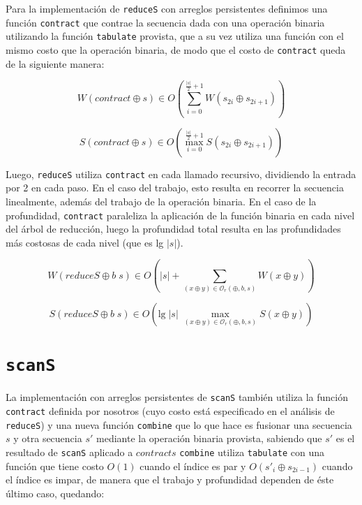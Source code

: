 \documentclass[a4paper,10pt]{article}
\begin{document}
Para la implementación de \texttt{reduceS} con arreglos persistentes definimos
una función \texttt{contract} que contrae la secuencia dada con una operación
binaria utilizando la función \texttt{tabulate} provista, que a su vez utiliza
una función con el mismo costo que la operación binaria, de modo que el costo
de \texttt{contract} queda de la siguiente manera:

\begin{equation*}
    W \left( contract \oplus s \right) \in
    O \left( \sum_{i=0}^{\frac{\vert s \vert}{2} + 1} W \left( s_{2i} \oplus s_{2i+1} \right) \right)
\end{equation*}

\begin{equation*}
    S \left( contract \oplus s \right) \in
    O \left( \max_{i=0}^{\frac{\vert s \vert}{2} + 1} S \left( s_{2i} \oplus s_{2i+1} \right) \right)
\end{equation*}

Luego, \texttt{reduceS} utiliza \texttt{contract} en cada llamado recursivo,
dividiendo la entrada por 2 en cada paso. En el caso del trabajo, esto resulta
en recorrer la secuencia linealmente, además del trabajo de la operación binaria.
En el caso de la profundidad, \texttt{contract} paraleliza la aplicación de la
función binaria en cada nivel del árbol de reducción, luego la profundidad total
resulta en las profundidades más costosas de cada nivel (que es lg $\vert s \vert$).

\begin{equation*}
    W \left( reduceS \oplus b \; s \right) \in
    O \left( \vert s \vert + \sum_{(x \oplus y) \in \mathcal{O}_r(\oplus,b,s)} W \left( x \oplus y \right) \right)
\end{equation*}

\begin{equation*}
    S \left( reduceS \oplus b \; s \right) \in
    O \left( \text{lg} \; \vert s \vert \; \max_{(x \oplus y) \in \mathcal{O}_r(\oplus,b,s)} S \left( x \oplus y \right) \right)
\end{equation*}

\section*{\texttt{scanS}}

La implementación con arreglos persistentes de \texttt{scanS} también utiliza
la función \texttt{contract} definida por nosotros (cuyo costo está especificado
en el análisis de \texttt{reduceS}) y una nueva función \texttt{combine} que lo
que hace es fusionar una secuencia $s$ y otra secuencia $s'$ mediante la operación
binaria provista, sabiendo que $s'$ es el resultado de \texttt{scanS} aplicado a
$contract s$
\texttt{combine} utiliza \texttt{tabulate} con una función que tiene costo $O \left( 1 \right)$
cuando el índice es par y $O \left( s'_{i} \oplus s_{2i-1} \right)$ cuando el índice 
es impar, de manera que el trabajo y profundidad dependen de éste último caso,
quedando:
\end{document}
